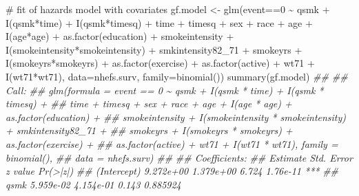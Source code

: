 \documentclass[
  10pt,
  a4paper,
]{book}
\newenvironment{Shaded}{\begin{snugshade}}{\end{snugshade}}
\newcommand{\AttributeTok}[1]{\textcolor[rgb]{0.40,0.45,0.13}{#1}}
\newcommand{\CommentTok}[1]{\textcolor[rgb]{0.37,0.37,0.37}{#1}}
\newcommand{\DecValTok}[1]{\textcolor[rgb]{0.68,0.00,0.00}{#1}}
\newcommand{\DocumentationTok}[1]{\textcolor[rgb]{0.37,0.37,0.37}{\textit{#1}}}
\newcommand{\FunctionTok}[1]{\textcolor[rgb]{0.28,0.35,0.67}{#1}}
\newcommand{\NormalTok}[1]{\textcolor[rgb]{0.00,0.46,0.62}{#1}}
\newcommand{\OtherTok}[1]{\textcolor[rgb]{0.00,0.46,0.62}{#1}}
\newcommand{\SpecialCharTok}[1]{\textcolor[rgb]{0.37,0.37,0.37}{#1}}
\begin{document}
\begin{Shaded}
\begin{Highlighting}[]
\CommentTok{\# fit of hazards model with covariates}
\NormalTok{gf.model }\OtherTok{\textless{}{-}} \FunctionTok{glm}\NormalTok{(event}\SpecialCharTok{==}\DecValTok{0} \SpecialCharTok{\textasciitilde{}}\NormalTok{ qsmk }\SpecialCharTok{+} \FunctionTok{I}\NormalTok{(qsmk}\SpecialCharTok{*}\NormalTok{time) }\SpecialCharTok{+} \FunctionTok{I}\NormalTok{(qsmk}\SpecialCharTok{*}\NormalTok{timesq)}
                \SpecialCharTok{+}\NormalTok{ time }\SpecialCharTok{+}\NormalTok{ timesq }\SpecialCharTok{+}\NormalTok{ sex }\SpecialCharTok{+}\NormalTok{ race }\SpecialCharTok{+}\NormalTok{ age }\SpecialCharTok{+} \FunctionTok{I}\NormalTok{(age}\SpecialCharTok{*}\NormalTok{age)}
                \SpecialCharTok{+} \FunctionTok{as.factor}\NormalTok{(education) }\SpecialCharTok{+}\NormalTok{ smokeintensity }
                \SpecialCharTok{+} \FunctionTok{I}\NormalTok{(smokeintensity}\SpecialCharTok{*}\NormalTok{smokeintensity) }\SpecialCharTok{+}\NormalTok{ smkintensity82\_71 }
                \SpecialCharTok{+}\NormalTok{ smokeyrs }\SpecialCharTok{+} \FunctionTok{I}\NormalTok{(smokeyrs}\SpecialCharTok{*}\NormalTok{smokeyrs) }\SpecialCharTok{+} \FunctionTok{as.factor}\NormalTok{(exercise) }
                \SpecialCharTok{+} \FunctionTok{as.factor}\NormalTok{(active) }\SpecialCharTok{+}\NormalTok{ wt71 }\SpecialCharTok{+} \FunctionTok{I}\NormalTok{(wt71}\SpecialCharTok{*}\NormalTok{wt71), }
                \AttributeTok{data=}\NormalTok{nhefs.surv, }\AttributeTok{family=}\FunctionTok{binomial}\NormalTok{())}
\FunctionTok{summary}\NormalTok{(gf.model)}
\DocumentationTok{\#\# }
\DocumentationTok{\#\# Call:}
\DocumentationTok{\#\# glm(formula = event == 0 \textasciitilde{} qsmk + I(qsmk * time) + I(qsmk * timesq) + }
\DocumentationTok{\#\#     time + timesq + sex + race + age + I(age * age) + as.factor(education) + }
\DocumentationTok{\#\#     smokeintensity + I(smokeintensity * smokeintensity) + smkintensity82\_71 + }
\DocumentationTok{\#\#     smokeyrs + I(smokeyrs * smokeyrs) + as.factor(exercise) + }
\DocumentationTok{\#\#     as.factor(active) + wt71 + I(wt71 * wt71), family = binomial(), }
\DocumentationTok{\#\#     data = nhefs.surv)}
\DocumentationTok{\#\# }
\DocumentationTok{\#\# Coefficients:}
\DocumentationTok{\#\#                                      Estimate Std. Error z value Pr(\textgreater{}|z|)    }
\DocumentationTok{\#\# (Intercept)                         9.272e+00  1.379e+00   6.724 1.76e{-}11 ***}
\DocumentationTok{\#\# qsmk                                5.959e{-}02  4.154e{-}01   0.143 0.885924    }

\end{Highlighting}
\end{Shaded}
\end{document}

